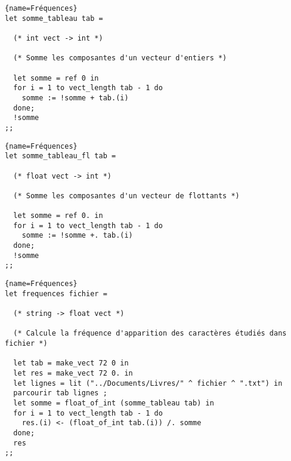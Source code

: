\documentclass[10pt,twoside,a4paper]{article}
\begin{document}
\begin{lstlisting}{name=Fréquences}
let somme_tableau tab =

  (* int vect -> int *)

  (* Somme les composantes d'un vecteur d'entiers *)
  
  let somme = ref 0 in
  for i = 1 to vect_length tab - 1 do
    somme := !somme + tab.(i)
  done;
  !somme
;;
\end{lstlisting}
\pagebreak
\begin{lstlisting}{name=Fréquences}
let somme_tableau_fl tab =

  (* float vect -> int *)

  (* Somme les composantes d'un vecteur de flottants *)
  
  let somme = ref 0. in
  for i = 1 to vect_length tab - 1 do
    somme := !somme +. tab.(i)
  done;
  !somme
;;
\end{lstlisting}  

\begin{lstlisting}{name=Fréquences}
let frequences fichier =

  (* string -> float vect *)

  (* Calcule la fréquence d'apparition des caractères étudiés dans fichier *)
  
  let tab = make_vect 72 0 in
  let res = make_vect 72 0. in
  let lignes = lit ("../Documents/Livres/" ^ fichier ^ ".txt") in
  parcourir tab lignes ;
  let somme = float_of_int (somme_tableau tab) in
  for i = 1 to vect_length tab - 1 do
    res.(i) <- (float_of_int tab.(i)) /. somme
  done;
  res
;;
\end{lstlisting}
\end{document}
